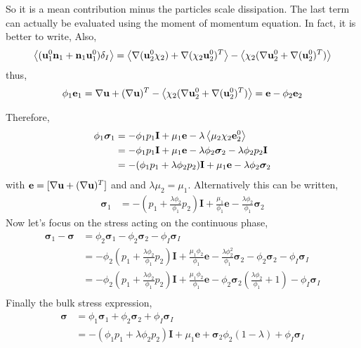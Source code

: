 So it is a mean contribution minus the particles scale dissipation. 
The last term can actually be evaluated using the moment of momentum equation. 
In fact, it is better to write, 
Also,
\begin{align}
    \left<(\textbf{u}_1^0 \textbf{n}_1 +  \textbf{n}_1\textbf{u}_1^0)\delta_I\right>
    = \left<\mathbf{\nabla}(\textbf{u}_2^0 \chi_2) +  \mathbf{\nabla}(\chi_2\textbf{u}_2^0)^T\right>
    - \left<\chi_2 (\mathbf{\nabla}\textbf{u}_2^0 + \mathbf{\nabla}(\textbf{u}_2^0 )^T)\right>
\end{align}
thus,
\begin{align*}
    \phi_1 \textbf{e}_1
    = \nabla \textbf{u}+ (\mathbf{\nabla} \textbf{u})^T
    - \left<\chi_2 (\mathbf{\nabla}\textbf{u}_2^0 + \mathbf{\nabla}(\textbf{u}_2^0 )^T)\right>
    = \textbf{e}
    - \phi_2 \textbf{e}_2
\end{align*}




Therefore, 
\begin{align*}
    \phi_1 \bm{\sigma}_1 
    &= - \phi_1 p_1 \textbf{I}
    + \mu_1 \textbf{e}
    - \lambda \left<\mu_2 \chi_2 \textbf{e}^0_2\right>\\
    &= - \phi_1 p_1 \textbf{I}
    + \mu_1 \textbf{e}
    - \lambda \phi_2 \bm{\sigma}_2
    - \lambda \phi_2 p_2 \textbf{I}\\
    &= - (\phi_1 p_1+ \lambda \phi_2 p_2) \textbf{I}
    + \mu_1 \textbf{e}
    - \lambda \phi_2 \bm{\sigma}_2\\
\end{align*}
with $\textbf{e} = [\nabla \textbf{u}+ (\mathbf{\nabla} \textbf{u})^T]$ and 
and $\lambda \mu_2 = \mu_1$.
Alternatively  this can be written, 
\begin{align*}
    \bm{\sigma}_1 
    &= - \left(p_1 + \frac{\lambda \phi_2}{\phi_1} p_2\right) \textbf{I}
    + \frac{\mu_1}{\phi_1} \textbf{e}
    - \frac{\lambda \phi_2}{\phi_1} \bm{\sigma}_2
\end{align*}
Now let's focus on the stress acting on the continuous phase, 
\begin{align*}
    \bm{\sigma}_1 - \bm{\sigma}
    &= \phi_2 \bm{\sigma}_1  
    - \phi_2\bm{\sigma}_2 - \phi_I \bm{\sigma}_I\\
    &=- \phi_2 \left(p_1 + \frac{\lambda \phi_2}{\phi_1} p_2\right) \textbf{I}
    + \frac{\mu_1\phi_2}{\phi_1} \textbf{e}
    - \frac{\lambda \phi_2^2}{\phi_1} \bm{\sigma}_2
    - \phi_2\bm{\sigma}_2 - \phi_I \bm{\sigma}_I\\
    &=- \phi_2 \left(p_1 + \frac{\lambda \phi_2}{\phi_1} p_2\right) \textbf{I}
    + \frac{\mu_1\phi_2}{\phi_1} \textbf{e}
    - \phi_2\bm{\sigma}_2 \left(
        \frac{\lambda \phi_2}{\phi_1} + 1
    \right)
    - \phi_I \bm{\sigma}_I\\
\end{align*}
Finally the bulk stress expression, 
\begin{align*}
    \bm{\sigma}
    &= \phi_1 \bm{\sigma}_1 
    +\phi_2 \bm{\sigma}_2 
    +\phi_I \bm{\sigma}_I \\
    &= - (\phi_1 p_1 + \lambda \phi_2 p_2) \textbf{I}
    + \mu_1 \textbf{e}
    + \bm{\sigma}_2 \phi_2 (1 - \lambda)
    +\phi_I \bm{\sigma}_I \\
\end{align*}

